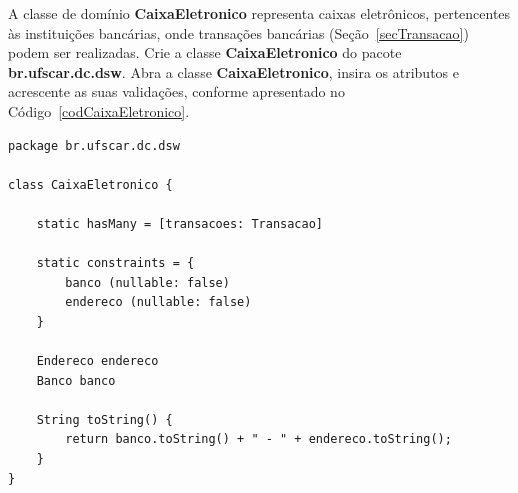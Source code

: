 \vspace{0.5cm}

A  classe  de  domínio  {\bf  CaixaEletronico}  representa  caixas  eletrônicos,
pertencentes    às   instituições    bancárias,   onde    transações   bancárias
(Seção~\ref{secTransacao})   podem   ser  realizadas.    Crie   a  classe   {\bf
  CaixaEletronico}  do  pacote  {\bf  br.ufscar.dc.dsw}.   Abra  a  classe  {\bf
  CaixaEletronico},  insira  os  atributos  e  acrescente  as  suas  validações,
conforme apresentado no Código~\ref{codCaixaEletronico}. 

\begin{lstlisting}[caption=Classe  de  domínio  {\bf CaixaEletronico},  frame  =
    trBL, float=htbp, label=codCaixaEletronico] 
package br.ufscar.dc.dsw

class CaixaEletronico {

    static hasMany = [transacoes: Transacao]
    
    static constraints = {
        banco (nullable: false)
        endereco (nullable: false)
    }
    
    Endereco endereco
    Banco banco
    
    String toString() {
        return banco.toString() + " - " + endereco.toString();
    }
}
\end{lstlisting}

\hspace{1cm}\\
\hspace{1cm}\\

